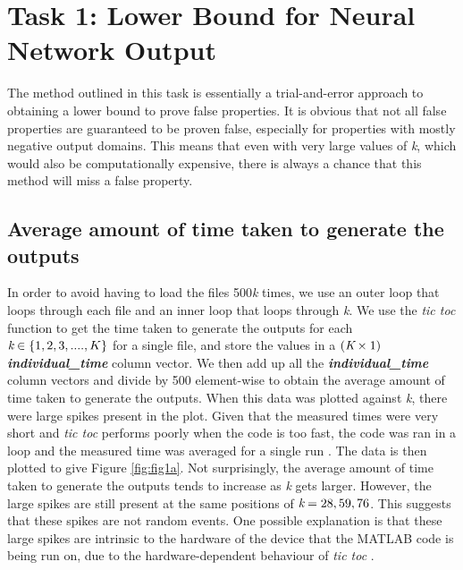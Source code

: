 \documentclass[11pt]{article}
\begin{document}
\section{Task 1: Lower Bound for Neural Network Output}
\label{sec:Task 1}
The method outlined in this task is essentially a trial-and-error approach to obtaining a lower bound to prove false properties. It is obvious that not all false properties are guaranteed to be proven false, especially for properties with mostly negative output domains. This means that even with very large values of \emph{k}, which would also be computationally expensive, there is always a chance that this method will miss a false property.
\subsection{Average amount of time taken to generate the outputs}
\label{sec:131}
 In order to avoid having to load the files 500\emph{k} times, we use an outer loop that loops through each file and an inner loop that loops through \emph{k}. We use the \emph{tic toc} function to get the time taken to generate the outputs for each $\emph{k}\in{\{1,2,3,....,K\}}$ for a single file, and store the values in a $(\emph{K}\times1)$ \emph{\textbf{individual\_time}} column vector. We then add up all the \emph{\textbf{individual\_time}} column vectors and divide by 500 element-wise to obtain the average amount of time taken to generate the outputs. When this data was plotted against \emph{k}, there were large spikes present in the plot. Given that the measured times were very short and \emph{tic toc} performs poorly when the code is too fast, the code was ran in a loop and the measured time was averaged for a single run \cite{tictoc}. The data is then plotted to give Figure \ref{fig:fig1a}. Not surprisingly, the average amount of time taken to generate the outputs tends to increase as \emph{k} gets larger. However, the large spikes are still present at the same positions of $\emph{k}=28,59,76$. This suggests that these spikes are not random events. One possible explanation is that these large spikes are intrinsic to the hardware of the device that the MATLAB code is being run on, due to the hardware-dependent behaviour of \emph{tic toc} \cite{hardware}.
 
\end{document}
